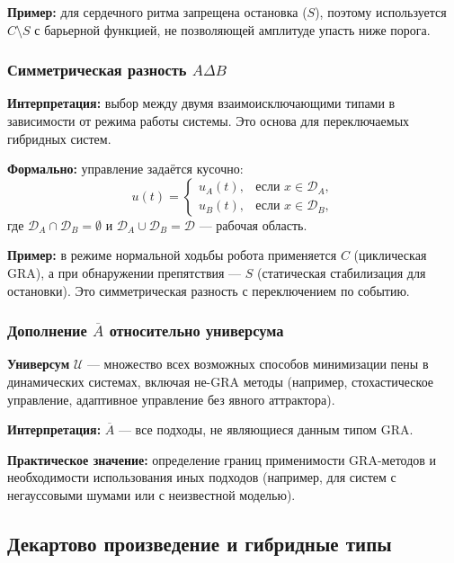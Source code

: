 \documentclass[12pt,a4paper]{article}
\newcommand{\U}{\mathcal{U}}
\begin{document}
\textbf{Пример:} для сердечного ритма запрещена остановка ($S$), поэтому используется $C \setminus S$ с барьерной функцией, не позволяющей амплитуде упасть ниже порога.

\subsubsection{Симметрическая разность $A \Delta B$}

\textbf{Интерпретация:} выбор между двумя взаимоисключающими типами в зависимости от режима работы системы. Это основа для переключаемых гибридных систем.

\textbf{Формально:} управление задаётся кусочно:
\begin{equation}
    u(t) = \begin{cases}
        u_A(t), & \text{если } x \in \mathcal{D}_A, \\
        u_B(t), & \text{если } x \in \mathcal{D}_B,
    \end{cases}
\end{equation}
где $\mathcal{D}_A \cap \mathcal{D}_B = \emptyset$ и $\mathcal{D}_A \cup \mathcal{D}_B = \mathcal{D}$ — рабочая область.

\textbf{Пример:} в режиме нормальной ходьбы робота применяется $C$ (циклическая GRA), а при обнаружении препятствия — $S$ (статическая стабилизация для остановки). Это симметрическая разность с переключением по событию.

\subsubsection{Дополнение $\overline{A}$ относительно универсума}

\textbf{Универсум} $\U$ — множество всех возможных способов минимизации пены в динамических системах, включая не-GRA методы (например, стохастическое управление, адаптивное управление без явного аттрактора).

\textbf{Интерпретация:} $\overline{A}$ — все подходы, не являющиеся данным типом GRA.

\textbf{Практическое значение:} определение границ применимости GRA-методов и необходимости использования иных подходов (например, для систем с негауссовыми шумами или с неизвестной моделью).

\subsection{Декартово произведение и гибридные типы}
\end{document}
